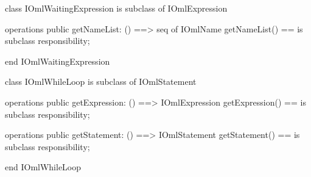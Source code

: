 \begin{vdm_al}
class IOmlWaitingExpression
 is subclass of IOmlExpression

operations
  public getNameList: () ==> seq of IOmlName
  getNameList() == is subclass responsibility;

end IOmlWaitingExpression
\end{vdm_al}

\begin{vdm_al}
class IOmlWhileLoop
 is subclass of IOmlStatement

operations
  public getExpression: () ==> IOmlExpression
  getExpression() == is subclass responsibility;

operations
  public getStatement: () ==> IOmlStatement
  getStatement() == is subclass responsibility;

end IOmlWhileLoop
\end{vdm_al}

